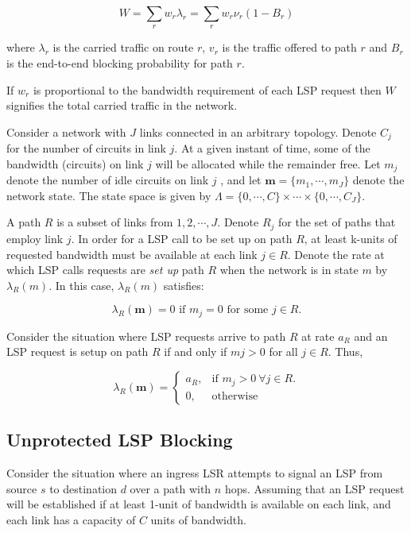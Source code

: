 \begin{equation}
W=\sum_r w_r\lambda_r = \sum_r w_r \nu_r(1 - B_r)
\end{equation}

where $\lambda_r$ is the carried traffic on route $r$, $v_r$ is the traffic offered to path $r$ and $B_r$ is the end-to-end blocking probability for path $r$.

If $w_r$ is proportional to the bandwidth requirement of each LSP request then $W$ signifies the total carried traffic in the network.

Consider a network with $J$ links connected in an arbitrary topology. Denote $C_j$ for the number of circuits in link $j$. At a given instant of time, some of the bandwidth (circuits) on link $j$ will be allocated while the remainder free. Let $m_j$ denote the number of idle circuits on link $j$ , and let $\textbf{m} = \{m_1, \cdots , m_J\}$ denote the network state. The state space is given by $\Lambda = \{0, \cdots, C\} \times \cdots \times \{0, \cdots , C_J\}$.

A path $R$ is a subset of links from ${1,2, \cdots, J}$. Denote $R_j$ for the set of paths that employ link $j$. In order for a LSP call to be set up on path $R$, at least k-units of requested bandwidth must be available at each link $j \in R$. Denote the rate at which LSP calls requests are \emph{set up} path $R$ when the network is in state $m$ by $\lambda_R(m)$. In this case, $\lambda_R(m)$ satisfies:

\begin{equation}
\lambda_R(\textbf{m})= 0 \text{ if } m_j=0 \text{ for some } j \in R.
\end{equation}

Consider the situation where LSP requests arrive to path $R$ at rate $a_R$ and an LSP request is setup on path $R$ if and only if $mj > 0$ for all $j \in R$. Thus,

\begin{equation}
\lambda_R(\textbf{m})=
\begin{cases}
a_R, &\text{if $m_j > 0~\forall j \in R$.} \\
0, &\text{otherwise}
\end{cases}
\end{equation}


\subsection{Unprotected LSP Blocking}
Consider the situation where an ingress LSR attempts to signal an LSP from source $s$ to destination $d$ over a path with $n$ hops. Assuming that an LSP request will be established if at least 1-unit of bandwidth is available on each link, and each link has a capacity of $C$ units of bandwidth.

